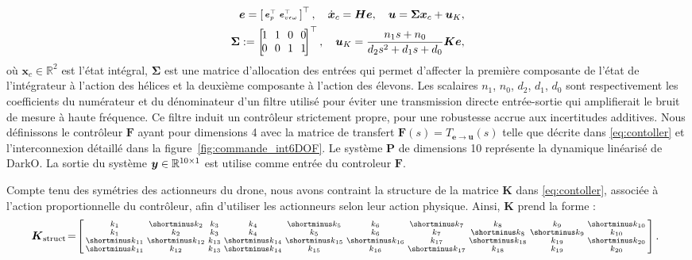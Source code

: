 \begin{subequations}
    \label{eq:contoller}
    \begin{align}
        \boldsymbol{e} = \smallmat{
        \boldsymbol{e}_{p}^\top & \boldsymbol{e}_{v\epsilon\omega}^\top}^\top, \quad \dot{\boldsymbol{x}}_{c} = \boldsymbol{H} \boldsymbol{e}, \quad    \boldsymbol{u} = \boldsymbol{\Sigma} \boldsymbol{x}_{c} + \boldsymbol{u}_{K},
        \\
        \boldsymbol{\Sigma} := \begin{bmatrix} \! 1 \!&\! 1\! & \!0\! &\! 0\!\\ \!0\! & \!0\! & \!1 \!& \!1\!\end{bmatrix}^\top, \quad
        \boldsymbol{u}_{K} = \frac{n_1 s+n_0}{d_2 s^{2}+d_1 s + d_0}\boldsymbol{K} \boldsymbol{e} ,
    \end{align}
\end{subequations}
où $\boldsymbol{x}_{c} \in \mathbb{R}^{2}$ est l'état intégral, $\boldsymbol{\Sigma}$ est une matrice d'allocation des entrées qui permet d'affecter la première composante de l'état de l'intégrateur à l'action des hélices et la deuxième composante à l'action des élevons. Les scalaires $n_1$, $n_0$,  $d_2$,  $d_1$,  $d_0$ sont respectivement les coefficients du numérateur et du dénominateur d'un filtre utilisé pour éviter une transmission directe entrée-sortie qui amplifierait le bruit de mesure à haute fréquence. Ce filtre induit un contrôleur strictement propre, pour une robustesse accrue aux incertitudes additives. Nous définissons le contrôleur $\boldsymbol{F}$ ayant pour dimensions 4 avec la matrice de transfert $\boldsymbol{F}(s) = T_{\boldsymbol{e} \rightarrow \boldsymbol{u}}(s)$ telle que décrite dans \eqref{eq:contoller} et l'interconnexion détaillé dans la figure~\ref{fig:commande_int6DOF}. Le système $\boldsymbol{P}$ de dimensions 10 représente la dynamique linéarisé de DarkO. La sortie du système $\boldsymbol{y} \in {\mathbb R}^{10\times1}$ est utilise comme entrée du controleur $\boldsymbol{F}$.

Compte tenu des symétries des actionneurs du drone, nous avons contraint la structure de la matrice $\boldsymbol{K}$ dans \eqref{eq:contoller}, associée à l'action proportionnelle du contrôleur, afin d'utiliser les actionneurs selon leur action physique. Ainsi, $\boldsymbol{K}$ prend la forme : 
\begin{align}
\label{eq:k_struct}
    \!\!\!\boldsymbol{K}_{\text{struct}} \!=\!  \smallmat{
             k_{1}& \shortminus k_{2}& k_{3}&  k_{4}& \shortminus k_{5}&  k_{6}& \shortminus k_{7}&  k_{8}&  k_{9}& \shortminus k_{10}\\
             k_{1}&  k_{2}& k_{3}&  k_{4}&  k_{5}&  k_{6}&   k_{7}& \shortminus k_{8}& \shortminus k_{9}&  k_{10}\\
            \shortminus k_{11}& \shortminus k_{12}& k_{13}& \shortminus k_{14}& \shortminus k_{15}& \shortminus k_{16}&   k_{17}& \shortminus k_{18}&  k_{19}& \shortminus k_{20}\\
            \shortminus k_{11}&  k_{12}& k_{13}& \shortminus k_{14}&  k_{15}&  k_{16}&   \shortminus k_{17}&  k_{18}&  k_{19}&  k_{20} 
         }.
\end{align}

